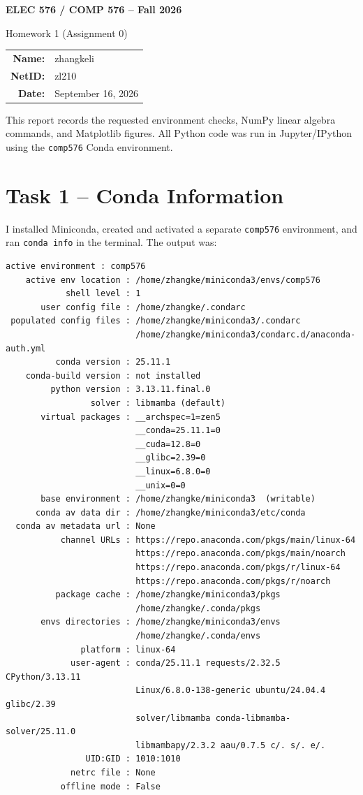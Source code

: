 \documentclass[11pt]{article}
\newcommand{\code}[1]{\texttt{#1}}
\begin{document}
\begin{center}
  {\LARGE\bfseries ELEC 576 / COMP 576 -- Fall 2026}\par
  \vspace{5pt}
  {\Large Homework 1 (Assignment 0)}\par
  \vspace{12pt}
  \begin{tabular}{rl}
    \textbf{Name:} & zhangkeli \\
    \textbf{NetID:} & zl210 \\
    \textbf{Date:} & September 16, 2026
  \end{tabular}
\end{center}

This report records the requested environment checks, NumPy linear algebra
commands, and Matplotlib figures. All Python code was run in Jupyter/IPython
using the \code{comp576} Conda environment.

\section{Task 1 -- Conda Information}

I installed Miniconda, created and activated a separate \code{comp576}
environment, and ran \code{conda info} in the terminal. The output was:

\begin{lstlisting}[style=terminal]
     active environment : comp576
    active env location : /home/zhangke/miniconda3/envs/comp576
            shell level : 1
       user config file : /home/zhangke/.condarc
 populated config files : /home/zhangke/miniconda3/.condarc
                          /home/zhangke/miniconda3/condarc.d/anaconda-auth.yml
          conda version : 25.11.1
    conda-build version : not installed
         python version : 3.13.11.final.0
                 solver : libmamba (default)
       virtual packages : __archspec=1=zen5
                          __conda=25.11.1=0
                          __cuda=12.8=0
                          __glibc=2.39=0
                          __linux=6.8.0=0
                          __unix=0=0
       base environment : /home/zhangke/miniconda3  (writable)
      conda av data dir : /home/zhangke/miniconda3/etc/conda
  conda av metadata url : None
           channel URLs : https://repo.anaconda.com/pkgs/main/linux-64
                          https://repo.anaconda.com/pkgs/main/noarch
                          https://repo.anaconda.com/pkgs/r/linux-64
                          https://repo.anaconda.com/pkgs/r/noarch
          package cache : /home/zhangke/miniconda3/pkgs
                          /home/zhangke/.conda/pkgs
       envs directories : /home/zhangke/miniconda3/envs
                          /home/zhangke/.conda/envs
               platform : linux-64
             user-agent : conda/25.11.1 requests/2.32.5 CPython/3.13.11
                          Linux/6.8.0-138-generic ubuntu/24.04.4 glibc/2.39
                          solver/libmamba conda-libmamba-solver/25.11.0
                          libmambapy/2.3.2 aau/0.7.5 c/. s/. e/.
                UID:GID : 1010:1010
             netrc file : None
           offline mode : False
\end{lstlisting}
\end{document}
